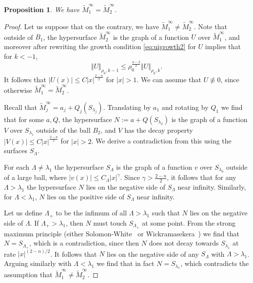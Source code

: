 \documentclass[12pt, reqno ]{amsart}
\newtheorem{prop}[theorem]{Proposition}
\numberwithin{equation}{section}
\begin{document}
\begin{prop} \label{prop: distinct} 
    We  have $\widetilde M^\infty_1= \widetilde M^\infty_2$. 
\end{prop}
\begin{proof}
Let us suppose that on the contrary, we have $\widetilde M_1^\infty\neq \widetilde M_2^\infty$. Note that outside of $B_1$, the hypersurface $\widetilde M^\infty_2$ is the graph of a function $U$ over $\widetilde M^\infty_1$, and moreover after rewriting the growth condition \eqref{eq:uigrowth2} for $U$ implies that for $k<-1$, 
\begin{equation} \label{proof: U Decay Eqn}
\Vert U\Vert_{\rho_0, k-1} \leq \rho_0^{\frac{n-2}{2}} \Vert U\Vert_{\rho_0, k}.
\end{equation}
It follows that $|U(x)| \leq C|x|^{\frac{2-n}{2}}$ for $|x| > 1$.  We can assume that $U\not\equiv 0$, since otherwise $\widetilde{M}^\infty_1 = \widetilde{M}^\infty_2$. 

Recall that $\widetilde M_j^\infty=a_j+Q_j(S_{\lambda_j})$. Translating by $a_1$ and rotating by $Q_1$ we find that for some $a, Q$, the hypersurface $N := a + Q(S_{\lambda_2})$ is the graph of a function $V$ over $S_{\lambda_1}$ outside of the ball $B_2$, and $V$ has the decay property $|V(x)| \leq C|x|^{\frac{2-n}{2}}$ for $|x| > 2$. We derive a contradiction from this using the surfaces $S_\Lambda$. 

For each $\Lambda \not=\lambda_1$ the hypersurface $S_\Lambda$ is the graph of a function $v$ over $S_{\lambda_0}$ outside of a large ball, where $|v(x)| \leq C_\Lambda |x|^\gamma$. Since $\gamma > \frac{2-n}{2}$, it follows that for any $\Lambda > \lambda_1$ the hypersurface $N$ lies on the negative side of $S_\Lambda$ near infinity. Similarly, for $\Lambda < \lambda_1$, $N$ lies on the positive side of $S_\Lambda$ near infinity. 

Let us define $\Lambda_+$ to be the infimum of all $\Lambda > \lambda_1$ such that $N$ lies on the negative side of $\Lambda$. If $\Lambda_+ > \lambda_1$, then $N$ must touch $S_{\Lambda_+}$ at some point. From the strong maximum principle (either Solomon-White~\cite{SolomonWhite} or Wickramasekera~\cite{Wickramasekera}) we find that $N=S_{\Lambda_+}$, which is a contradiction, since then $N$ does not decay towards $S_{\lambda_1}$ at rate $|x|^{(2-n)/2}$. It follows that $N$ lies on the negative side of any $S_\Lambda$ with $\Lambda > \lambda_1$. Arguing similarly with $\Lambda < \lambda_1$ we find that in fact $N=S_{\lambda_1}$, which contradicts the assumption that $\widetilde M^\infty_1 \not= \widetilde M^\infty_2$. 
\end{proof}
\end{document}
